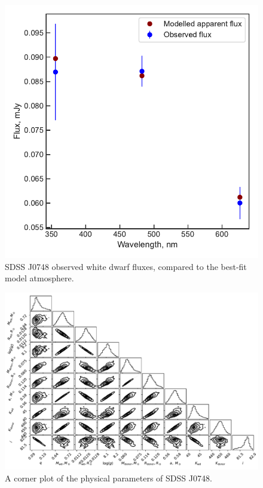 \begin{figure}
    \centering
    \includegraphics[width=\textwidth]{figures/results/SDSS0748/fluxplot.pdf}
    \caption{SDSS J0748 observed white dwarf fluxes, compared to the best-fit model atmosphere.}
    \label{fig:SDSS0748 flux plot}
\end{figure}
\begin{figure}
    \includegraphics[height=\textwidth, angle=90]{figures/results/physicalparams_corners/SDSS0748_physcorner.pdf}
    \caption{A corner plot of the physical parameters of SDSS J0748.}
\end{figure}
\clearpage



